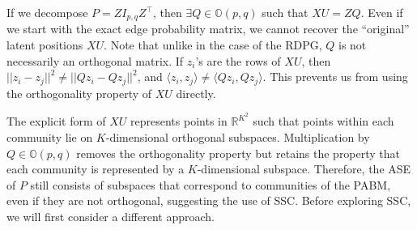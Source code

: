 \documentclass[12pt]{article}
\begin{document}
If we decompose \(P = Z I_{p, q} Z^\top\), then
\(\exists Q \in \mathbb{O}(p, q)\) such that \(XU = Z Q\). Even if we
start with the exact edge probability matrix, we cannot recover the
``original'' latent positions \(XU\). Note that unlike in the case of
the RDPG, \(Q\) is not necessarily an orthogonal matrix. If \(z_i\)'s
are the rows of \(XU\), then
\(||z_i - z_j||^2 \neq ||Q z_i - Q z_j||^2\), and
\(\langle z_i, z_j \rangle \neq \langle Q z_i, Q z_j \rangle\). This
prevents us from using the orthogonality property of \(XU\) directly. 

The explicit form of \(XU\) represents points in \(\mathbb{R}^{K^2}\)
such that points within each community lie on \(K\)-dimensional
orthogonal subspaces. Multiplication by \(Q \in \mathbb{O}(p, q)\)
removes the orthogonality property but retains the property that each
community is represented by a \(K\)-dimensional subspace. Therefore, the
ASE of \(P\) still consists of subspaces 
that correspond to communities of the PABM, even if they are not orthogonal, 
suggesting the use of SSC. Before exploring SSC, we will first consider
a different approach.
\end{document}
